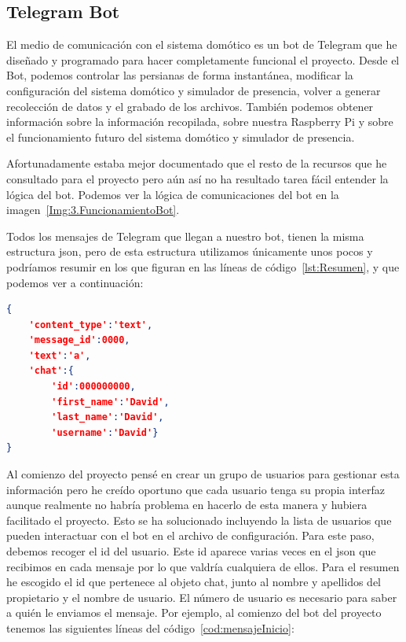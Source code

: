 \subsection{Telegram Bot}\label{5.TelegramBot}
El medio de comunicación con el sistema domótico es un bot de Telegram que he diseñado y programado para hacer completamente funcional el proyecto. Desde el Bot, podemos controlar las persianas de forma instantánea, modificar la configuración del sistema domótico y simulador de presencia, volver a generar recolección de datos y el grabado de los archivos. También podemos obtener información sobre la información recopilada, sobre nuestra Raspberry Pi y sobre el funcionamiento futuro del sistema domótico y simulador de presencia.



Afortunadamente estaba mejor documentado que el resto de la recursos que he consultado para el proyecto pero aún así no ha resultado tarea fácil entender la lógica del bot. 
Podemos ver la lógica de comunicaciones del bot en la imagen~\ref{Img:3.FuncionamientoBot}. 

Todos los mensajes de Telegram que llegan a nuestro bot, tienen la misma estructura json, pero de esta estructura utilizamos únicamente unos pocos y podríamos resumir en los que figuran en las líneas de código~\ref{lst:Resumen}, y que podemos ver a continuación:
\begin{lstlisting}[language=json,firstnumber=0, basicstyle=\small, caption={Resumen de los datos que utilizamos del mensaje de Telegram.},label={lst:Resumen}]
{
    'content_type':'text',
    'message_id':0000,
    'text':'a',
    'chat':{
        'id':000000000,
        'first_name':'David',
        'last_name':'David',
        'username':'David'}
}
\end{lstlisting}

Al comienzo del proyecto pensé en crear un grupo de usuarios para gestionar esta información pero he creído oportuno que cada usuario tenga su propia interfaz aunque realmente no habría problema en hacerlo de esta manera y hubiera facilitado el proyecto. Esto se ha solucionado incluyendo la lista de usuarios que pueden interactuar con el bot en el archivo de configuración. Para este paso, debemos recoger el id del usuario. Este id aparece varias veces en el json que recibimos en cada mensaje por lo que valdría cualquiera de ellos. Para el resumen he escogido el id que pertenece al objeto chat, junto al nombre y apellidos del propietario y el nombre de usuario.
El número de usuario es necesario para saber a quién le enviamos el mensaje. Por ejemplo, al comienzo del bot del proyecto tenemos las siguientes líneas del código~\ref{cod:mensajeInicio}:

